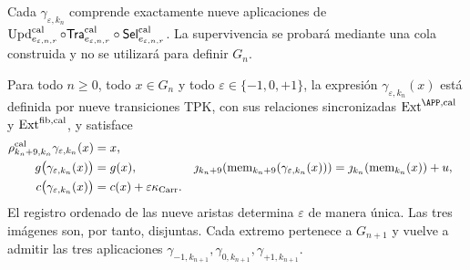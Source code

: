 Cada \(\gamma_{\varepsilon,k_n}\) comprende exactamente nueve aplicaciones
de \(\operatorname{Upd}^{\rm cal}_{e_{\varepsilon,n,r}}\circ
\mathsf{Tra}^{\rm cal}_{e_{\varepsilon,n,r}}\circ
\mathsf{Sel}^{\rm cal}_{e_{\varepsilon,n,r}}\). La
supervivencia se probará mediante una cola construida y no se utilizará para
definir \(G_n\).

\begin{lemma}
\label{ix:lem:elevacion-catalogal-nonadica}
Para todo \(n\ge0\), todo \(x\in G_n\) y todo
\(\varepsilon\in\{-1,0,+1\}\), la expresión
\(\gamma_{\varepsilon,k_n}(x)\) está definida por nueve transiciones TPK,
con sus relaciones sincronizadas
\(\operatorname{Ext}^{\APP,\rm cal}\) y
\(\operatorname{Ext}^{\rm fib,cal}\), y satisface
\begin{align}
 \rho^{\rm cal}_{k_n+9,k_n}\gamma_{\varepsilon,k_n}(x)&=x,
 \label{ix:eq:truncamiento-injerto-ch}\\
 g\bigl(\gamma_{\varepsilon,k_n}(x)\bigr)
   &=g(x),&
 \jmath_{k_n+9}\!\left(\operatorname{mem}_{k_n+9}
        (\gamma_{\varepsilon,k_n}(x))\right)
   &=\jmath_{k_n}\!\left(\operatorname{mem}_{k_n}(x)\right)+u,
 \label{ix:eq:fase-memoria-injerto-ch}\\
 c\bigl(\gamma_{\varepsilon,k_n}(x)\bigr)
   &=c(x)+\varepsilon\kappa_{\rm Carr}.&&
 \label{ix:eq:carry-injerto-ch}
\end{align}
\label{ix:eq:tres-vueltas-propiedades-ch}
\label{ix:eq:tres-vueltas-acarreo-ch}
El registro ordenado de las nueve aristas determina \(\varepsilon\) de manera única.
Las tres imágenes son, por tanto, disjuntas. Cada extremo pertenece a
\(G_{n+1}\) y vuelve a admitir las tres aplicaciones
\(\gamma_{-1,k_{n+1}},\gamma_{0,k_{n+1}},
\gamma_{+1,k_{n+1}}\).
\end{lemma}

